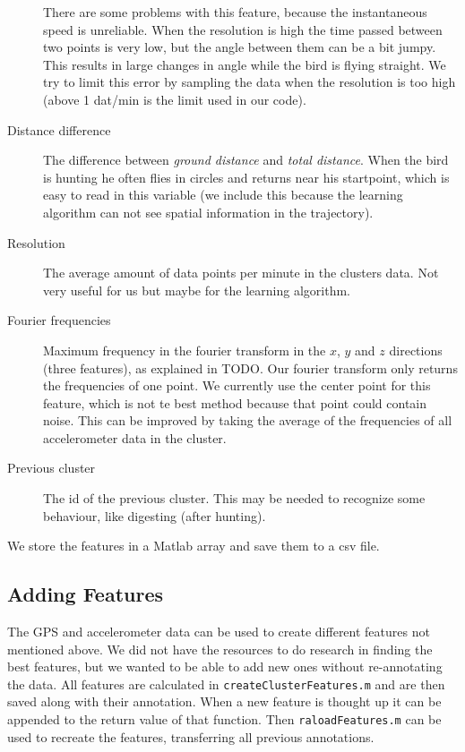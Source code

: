 \begin{description}
  There are some problems with this feature, because the instantaneous speed is unreliable. When the resolution is high the time passed between two points is very low, but the angle between them can be a bit jumpy. This results in large changes in angle while the bird is flying straight. We try to limit this error by sampling the data when the resolution is too high (above 1 dat/min is the limit used in our code).
  \item[Distance difference] The difference between \emph{ground distance} and \emph{total distance}. When the bird is hunting he often flies in circles and returns near his startpoint, which is easy to read in this variable (we include this because the learning algorithm can not see spatial information in the trajectory).
  \item[Resolution] The average amount of data points per minute in the clusters data. Not very useful for us but maybe for the learning algorithm.
  \item[Fourier frequencies] Maximum frequency in the fourier transform in the $x$, $y$ and $z$ directions (three features), as explained in TODO. Our fourier transform only returns the frequencies of one point. We currently use the center point for this feature, which is not te best method because that point could contain noise. This can be improved by taking the average of the frequencies of all accelerometer data in the cluster.
  \item[Previous cluster] The id of the previous cluster. This may be needed to recognize some behaviour, like digesting (after hunting).
 \end{description}

 We store the features in a Matlab array and save them to a csv file.

\subsection{Adding Features}
The GPS and accelerometer data can be used to create different features not mentioned above. We did not have the resources to do research in finding the best features, but we wanted to be able to add new ones without re-annotating the data. All features are calculated in \verb|createClusterFeatures.m| and are then saved along with their annotation. When a new feature is thought up it can be appended to the return value of that function. Then \verb|raloadFeatures.m| can be used to recreate the features, transferring all previous annotations. 

